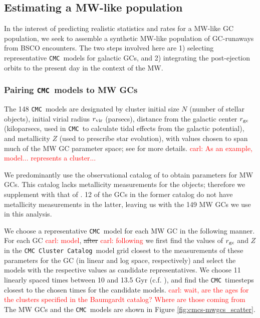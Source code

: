 \documentclass[twocolumn]{aastex631}
\newcommand{\CMC}{\texttt{CMC}}
\newcommand{\CMCcat}{\texttt{CMC Cluster Catalog}}
\newcommand{\carl}[1]{\textcolor{red}{carl: #1}}
\begin{document}
\subsection{Estimating a MW-like population} \label{subsec:est_MW-like}

In the interest of predicting realistic statistics and rates for a MW-like GC population, we seek to assemble a synthetic MW-like population of GC-runaways from BSCO encounters.
The two steps involved here are 1) selecting representative \CMC\ models for galactic GCs, and 2) integrating the post-ejection orbits to the present day in the context of the MW.

\subsubsection{Pairing \CMC\ models to MW GCs} \label{subsubsec:pairing}

The 148 \CMC\ models are designated by cluster initial size $N$ (number of stellar objects), initial virial radius $r_{\rm vir}$ (parsecs), distance from the galactic center $r_{\rm gc}$ (kiloparsecs, used in \CMC\ to calculate tidal effects from the galactic potential), and metallicity $Z$ (used to prescribe star evolution), with values chosen to span much of the MW GC parameter space; see \citet{2020IAUS..351..357K} for more details.  \carl{As an example, model... represents a cluster...}

We predominantly use the observational catalog of \citet{2018MNRAS.478.1520B} to obtain parameters for MW GCs.
This catalog lacks metallicity measurements for the objects; therefore we supplement with that of \citet{2010arXiv1012.3224H}.
12 of the GCs in the former catalog do not have metallicity measurements in the latter, leaving us with the 149 MW GCs we use in this analysis.

We choose a representative \CMC\ model for each MW GC in the following manner.
For each GC \carl{model}, \sout{after} \carl{following} \citet{2021ApJ...912..102R} we first find the values of $r_{\rm gc}$ and $Z$ in the \CMCcat\ model grid closest to the measurements of these parameters for the GC (in linear and log space, respectively) and select the models with the respective values as candidate representatives.
We choose 11 linearly spaced times between 10 and 13.5 Gyr (c.f. \citet{2013ApJ...775..134V}), and find the \CMC\ timesteps closest to the chosen times for the candidate models. \carl{wait, are the ages for the clusters specified in the Baumgardt catalog?  Where are those coming from}
The MW GCs and the \CMC\ models are shown in Figure \ref{fig:cmcs-mwgcs_scatter}.
\end{document}

